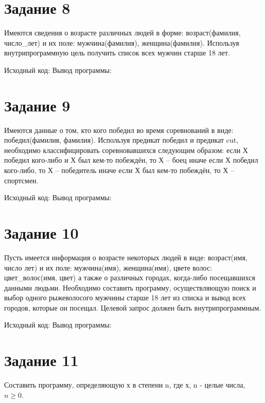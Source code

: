 \documentclass[a4paper,14pt]{article}
\begin{document}
    \section*{Задание 8}

    Имеются сведения о возрасте различных людей в форме:
    возраст(фамилия, число\_лет) и их поле: мужчина(фамилия), женщина(фамилия).
    Используя внутрипрограммную цель получить список всех мужчин старше 18 лет.

    Исходный код:
    {\small {}}
    Вывод программы:
    {\small {}}


    \section*{Задание 9}

    Имеются данные о том, кто кого победил во время соревнований в виде: победил(фамилия, фамилия).
    Используя предикат победил и предикат cut, необходимо классифицировать соревновавшихся следующим образом:
    если Х победил кого-либо и Х был кем-то побеждён, то Х -- боец
    иначе если Х победил кого-либо, то Х -- победитель
    иначе если Х был кем-то побеждён, то Х -- спортсмен.

    Исходный код:
    {\small {}}
    Вывод программы:
    {\small {}}


    \section*{Задание 10}

    Пусть имеется информация о возрасте некоторых людей в виде:
    возраст(имя, число лет) и их поле: мужчина(имя), женщина(имя), цвете волос: цвет\_волос(имя, цвет) а также о различных городах, когда-либо посещавшихся данными людьми. Необходимо составить программу, осуществляющую поиск и выбор одного рыжеволосого мужчины старше 18 лет из списка и вывод всех городов, которые он посещал. Целевой запрос должен быть внутрипрограммным.

    Исходный код:
    {\small {}}
    Вывод программы:
    {\small {}}


    \section*{Задание 11}

    Составить программу, определяющую х в степени n, где х, n - целые числа, $n \ge 0$.
\end{document}
